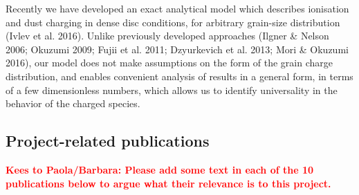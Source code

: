 \documentclass[10pt,fleqn,twoside]{article}
\newcommand{\todo}[1]{\textcolor{red}{\bf #1}}
\newcommand{\Tcol}{\color{blue}}
\begin{document}
Recently we have developed an exact analytical model which describes ionisation and dust charging in dense disc conditions,
for arbitrary grain-size distribution (Ivlev et al. 2016). Unlike previously developed approaches (Ilgner \& Nelson 2006; Okuzumi 2009; Fujii et al. 2011; Dzyurkevich et al. 2013; Mori \& Okuzumi 2016), our model does not make assumptions on the form of the grain charge distribution, and enables convenient analysis of results in a general form, in terms of a few dimensionless numbers, which allows us to identify universality in the behavior of the charged species.


\subsection{\Tcol Project-related publications}
%
%

\todo{Kees to Paola/Barbara: Please add some text in each of the 10 publications
below to argue what their relevance is to this project.}
\end{document}
